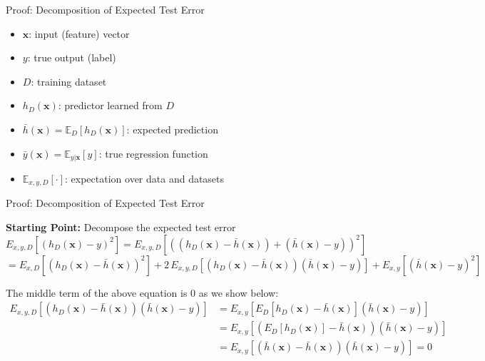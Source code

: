 \documentclass[serif, aspectratio=169]{beamer}
\begin{document}
    \begin{frame}{Proof: Decomposition of Expected Test Error}

        \begin{itemize}
            \item $\mathbf{x}$: input (feature) vector
            \item $y$: true output (label)
            \item $D$: training dataset
            \item $h_D(\mathbf{x})$: predictor learned from $D$
            \item $\bar{h}(\mathbf{x}) = \mathbb{E}_D[h_D(\mathbf{x})]$: expected prediction
            \item $\bar{y}(\mathbf{x}) = \mathbb{E}_{y|\mathbf{x}}[y]$: true regression function
            \item $\mathbb{E}_{x,y,D}[\cdot]$: expectation over data and datasets
        \end{itemize}
    \end{frame}





    \begin{frame}{Proof: Decomposition of Expected Test Error}

        \vspace{0.6em}
        \textbf{Starting Point:} Decompose the expected test error
        \[
            E_{x,y,D}\left[\left(h_D(\mathbf{x}) - y\right)^2\right] = E_{x,y,D}\left[\left((h_D(\mathbf{x}) - \bar{h}(\mathbf{x})) + (\bar{h}(\mathbf{x}) - y)\right)^2\right]
        \]
        \[
            = E_{x,D}\left[(h_D(\mathbf{x}) - \bar{h}(\mathbf{x}))^2\right] + 2\,E_{x,y,D}\left[(h_D(\mathbf{x}) - \bar{h}(\mathbf{x}))(\bar{h}(\mathbf{x}) - y)\right] + E_{x,y}\left[(\bar{h}(\mathbf{x}) - y)^2\right]
        \]

        The middle term of the above equation is 0 as we show below:
        \begin{align*}
            E_{x,y,D}\left[(h_D(\mathbf{x}) - \bar{h}(\mathbf{x}))(\bar{h}(\mathbf{x}) - y)\right] &= E_{x,y}\left[E_D\left[h_D(\mathbf{x}) - \bar{h}(\mathbf{x})\right](\bar{h}(\mathbf{x}) - y)\right] \\
            &= E_{x,y}\left[\left(E_D[h_D(\mathbf{x})] - \bar{h}(\mathbf{x})\right)(\bar{h}(\mathbf{x}) - y)\right] \\
            &= E_{x,y}\left[(\bar{h}(\mathbf{x}) - \bar{h}(\mathbf{x}))(\bar{h}(\mathbf{x}) - y)\right] = 0
        \end{align*}
    \end{frame}
\end{document}

